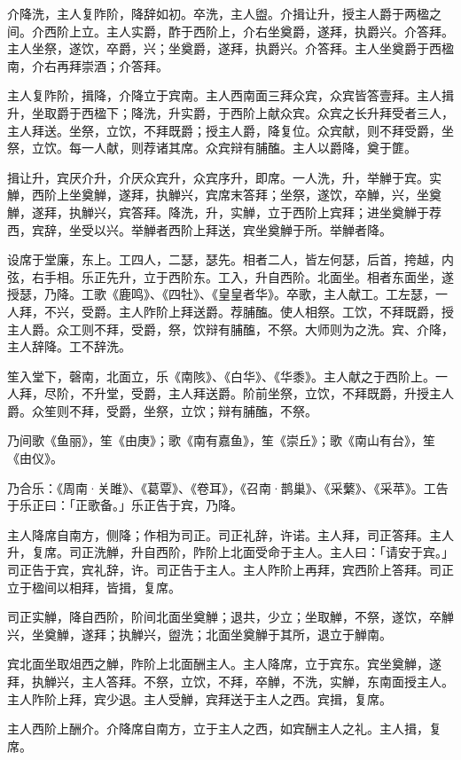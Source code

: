 \documentclass[]{article}
\begin{document}
介降洗，主人复阼阶，降辞如初。卒洗，主人盥。介揖让升，授主人爵于两楹之间。介西阶上立。主人实爵，酢于西阶上，介右坐奠爵，遂拜，执爵兴。介答拜。主人坐祭，遂饮，卒爵，兴；坐奠爵，遂拜，执爵兴。介答拜。主人坐奠爵于西楹南，介右再拜崇酒；介答拜。

主人复阼阶，揖降，介降立于宾南。主人西南面三拜众宾，众宾皆答壹拜。主人揖升，坐取爵于西楹下；降洗，升实爵，于西阶上献众宾。众宾之长升拜受者三人，主人拜送。坐祭，立饮，不拜既爵；授主人爵，降复位。众宾献，则不拜受爵，坐祭，立饮。每一人献，则荐诸其席。众宾辩有脯醢。主人以爵降，奠于篚。

揖让升，宾厌介升，介厌众宾升，众宾序升，即席。一人洗，升，举觯于宾。实觯，西阶上坐奠觯，遂拜，执觯兴，宾席末答拜；坐祭，遂饮，卒觯，兴，坐奠觯，遂拜，执觯兴，宾答拜。降洗，升，实觯，立于西阶上宾拜；进坐奠觯于荐西，宾辞，坐受以兴。举觯者西阶上拜送，宾坐奠觯于所。举觯者降。

设席于堂廉，东上。工四人，二瑟，瑟先。相者二人，皆左何瑟，后首，挎越，内弦，右手相。乐正先升，立于西阶东。工入，升自西阶。北面坐。相者东面坐，遂授瑟，乃降。工歌《鹿鸣》、《四牡》、《皇皇者华》。卒歌，主人献工。工左瑟，一人拜，不兴，受爵。主人阼阶上拜送爵。荐脯醢。使人相祭。工饮，不拜既爵，授主人爵。众工则不拜，受爵，祭，饮辩有脯醢，不祭。大师则为之洗。宾、介降，主人辞降。工不辞洗。

笙入堂下，磬南，北面立，乐《南陔》、《白华》、《华黍》。主人献之于西阶上。一人拜，尽阶，不升堂，受爵，主人拜送爵。阶前坐祭，立饮，不拜既爵，升授主人爵。众笙则不拜，受爵，坐祭，立饮；辩有脯醢，不祭。

乃间歌《鱼丽》，笙《由庚》；歌《南有嘉鱼》，笙《崇丘》；歌《南山有台》，笙《由仪》。

乃合乐：《周南·关雎》、《葛覃》、《卷耳》，《召南·鹊巢》、《采蘩》、《采苹》。工告于乐正曰：「正歌备。」乐正告于宾，乃降。

主人降席自南方，侧降；作相为司正。司正礼辞，许诺。主人拜，司正答拜。主人升，复席。司正洗觯，升自西阶，阼阶上北面受命于主人。主人曰：「请安于宾。」司正告于宾，宾礼辞，许。司正告于主人。主人阼阶上再拜，宾西阶上答拜。司正立于楹间以相拜，皆揖，复席。

司正实觯，降自西阶，阶间北面坐奠觯；退共，少立；坐取觯，不祭，遂饮，卒觯兴，坐奠觯，遂拜；执觯兴，盥洗；北面坐奠觯于其所，退立于觯南。

宾北面坐取俎西之觯，阼阶上北面酬主人。主人降席，立于宾东。宾坐奠觯，遂拜，执觯兴，主人答拜。不祭，立饮，不拜，卒觯，不洗，实觯，东南面授主人。主人阼阶上拜，宾少退。主人受觯，宾拜送于主人之西。宾揖，复席。

主人西阶上酬介。介降席自南方，立于主人之西，如宾酬主人之礼。主人揖，复席。
\end{document}
